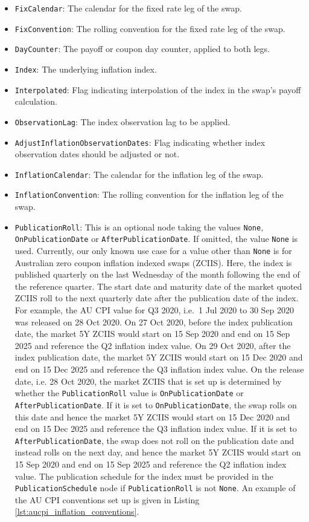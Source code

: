 \begin{itemize}
\item \lstinline!FixCalendar!: The calendar for the fixed rate leg of the swap.
\item \lstinline!FixConvention!: The rolling convention for the fixed rate leg of the swap.
\item \lstinline!DayCounter!: The payoff or coupon day counter, applied to both legs.
\item \lstinline!Index!: The underlying inflation index.
\item \lstinline!Interpolated!: Flag indicating interpolation of the index in the swap's payoff calculation.
\item \lstinline!ObservationLag!: The index observation lag to be applied.
\item \lstinline!AdjustInflationObservationDates!: Flag indicating whether index observation dates should be adjusted or not.
\item \lstinline!InflationCalendar!: The calendar for the inflation leg of the swap.
\item \lstinline!InflationConvention!: The rolling convention for the inflation leg of the swap.

\item \lstinline!PublicationRoll!:
This is an optional node taking the values \lstinline!None!, \lstinline!OnPublicationDate! or \lstinline!AfterPublicationDate!. If omitted, the value \lstinline!None! is used. Currently, our only known use case for a value other than \lstinline!None! is for Australian zero coupon inflation indexed swaps (ZCIIS). Here, the index is published quarterly on the last Wednesday of the month following the end of the reference quarter. The start date and maturity date of the market quoted ZCIIS roll to the next quarterly date after the publication date of the index. For example, the AU CPI value for Q3 2020, i.e.\ 1 Jul 2020 to 30 Sep 2020 was released on 28 Oct 2020. On 27 Oct 2020, before the index publication date, the market 5Y ZCIIS would start on 15 Sep 2020 and end on 15 Sep 2025 and reference the Q2 inflation index value. On 29 Oct 2020, after the index publication date, the market 5Y ZCIIS would start on 15 Dec 2020 and end on 15 Dec 2025 and reference the Q3 inflation index value. On the release date, i.e. 28 Oct 2020, the market ZCIIS that is set up is determined by whether the \lstinline!PublicationRoll! value is \lstinline!OnPublicationDate! or \lstinline!AfterPublicationDate!. If it is set to \lstinline!OnPublicationDate!, the swap rolls on this date and hence the market 5Y ZCIIS would start on 15 Dec 2020 and end on 15 Dec 2025 and reference the Q3 inflation index value. If it is set to \lstinline!AfterPublicationDate!, the swap does not roll on the publication date and instead rolls on the next day, and hence the market 5Y ZCIIS would start on 15 Sep 2020 and end on 15 Sep 2025 and reference the Q2 inflation index value. The publication schedule for the index must be provided in the \lstinline!PublicationSchedule! node if \lstinline!PublicationRoll! is not \lstinline!None!. An example of the AU CPI conventions set up is given in Listing \ref{lst:aucpi_inflation_conventions}.


\end{itemize}
